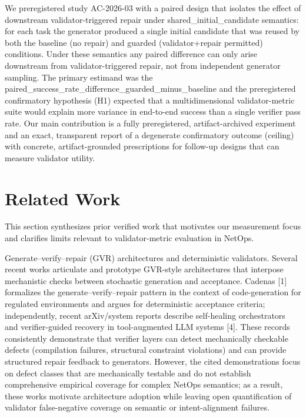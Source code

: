 \documentclass[conference]{IEEEtran}
\begin{document}
We preregistered study AC-2026-03 with a paired design that isolates the effect of downstream validator-triggered repair under shared\_initial\_candidate semantics: for each task the generator produced a single initial candidate that was reused by both the baseline (no repair) and guarded (validator+repair permitted) conditions. Under these semantics any paired difference can only arise downstream from validator-triggered repair, not from independent generator sampling. The primary estimand was the paired\_success\_rate\_difference\_guarded\_minus\_baseline and the preregistered confirmatory hypothesis (H1) expected that a multidimensional validator-metric suite would explain more variance in end-to-end success than a single verifier pass rate. Our main contribution is a fully preregistered, artifact-archived experiment and an exact, transparent report of a degenerate confirmatory outcome (ceiling) with concrete, artifact-grounded prescriptions for follow-up designs that can measure validator utility.

\section{Related Work}
This section synthesizes prior verified work that motivates our measurement focus and clarifies limits relevant to validator-metric evaluation in NetOps.

Generate--verify--repair (GVR) architectures and deterministic validators. Several recent works articulate and prototype GVR-style architectures that interpose mechanistic checks between stochastic generation and acceptance. Cadenas [1] formalizes the generate--verify--repair pattern in the context of code-generation for regulated environments and argues for deterministic acceptance criteria; independently, recent arXiv/system reports describe self-healing orchestrators and verifier-guided recovery in tool-augmented LLM systems [4]. These records consistently demonstrate that verifier layers can detect mechanically checkable defects (compilation failures, structural constraint violations) and can provide structured repair feedback to generators. However, the cited demonstrations focus on defect classes that are mechanically testable and do not establish comprehensive empirical coverage for complex NetOps semantics; as a result, these works motivate architecture adoption while leaving open quantification of validator false-negative coverage on semantic or intent-alignment failures.
\end{document}
